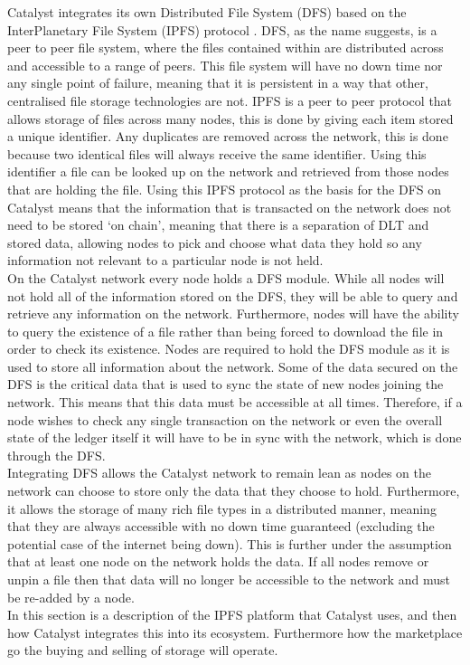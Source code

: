 Catalyst integrates its own Distributed File System (DFS) \cite{DFS} based on the InterPlanetary File System (IPFS) protocol \cite{benet2014ipfs}. DFS, as the name suggests, is a peer to peer file system, where the files contained within are distributed across and accessible to a range of peers. This file system will have no down time nor any single point of failure, meaning that it is persistent in a way that other, centralised file storage technologies are not. IPFS is a peer to peer protocol that allows storage of files across many nodes, this is done by giving each item stored a unique identifier. Any duplicates are removed across the network, this is done because two identical files will always receive the same identifier. Using this identifier a file can be looked up on the network and retrieved from those nodes that are holding the file. Using this IPFS protocol as the basis for the DFS on Catalyst means that the information that is transacted on the network does not need to be stored `on chain', meaning that there is a separation of DLT and stored data, allowing nodes to pick and choose what data they hold so any information not relevant to a particular node is not held. \\ %

On the Catalyst network every node holds a DFS module. While all nodes will not hold all of the information stored on the DFS, they will be able to query and retrieve any information on the network. Furthermore, nodes will have the ability to query the existence of a file rather than being forced to download the file in order to check its existence. Nodes are required to hold the DFS module as it is used to store all information about the network.  Some of the data secured on the DFS is the critical data that is used to sync the state of new nodes joining the network. This means that this data must be accessible at all times. Therefore, if a node wishes to check any single transaction on the network or even the overall state of the ledger itself it will have to be in sync with the network, which is done through the DFS.  \\ %

Integrating DFS allows the Catalyst network to remain lean as nodes on the network can choose to store only the data that they choose to hold. Furthermore, it allows the storage of many rich file types in a distributed manner, meaning that they are always accessible with no down time guaranteed (excluding the potential case of the internet being down). This is further under the assumption that at least one node on the network holds the data. If all nodes remove or unpin a file then that data will no longer be accessible to the network and must be re-added by a node. \\ %

In this section is a description of the IPFS platform that Catalyst uses, and then how Catalyst integrates this into its ecosystem. Furthermore how the marketplace go the buying and selling of storage will operate. 
